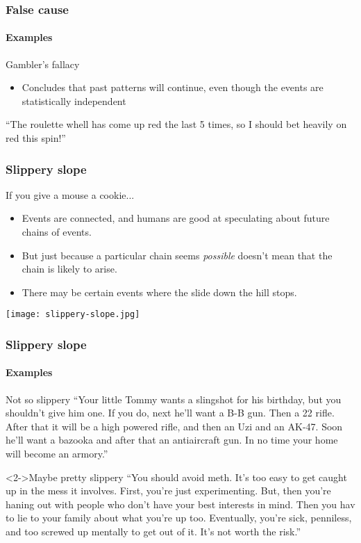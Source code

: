 \documentclass[10pt,letterpaper,xcolor=dvipsnames]{beamer}
\begin{document}
\begin{frame}
  \frametitle{False cause}
  \framesubtitle{Examples}
  
  \begin{block}{Gambler's fallacy}
    \begin{itemize}
      \item Concludes that past patterns will continue, even though the events are statistically independent
    \end{itemize}
    
    ``The roulette whell has come up red the last 5 times, so I should bet heavily on red this spin!''
  \end{block}
  
\end{frame}

\begin{frame}
  \frametitle{Slippery slope}
  
  \begin{block}{If you give a mouse a cookie...}
    \begin{itemize}
      \item Events are connected, and humans are good at speculating about future chains of events.
      \item But just because a particular chain seems \textit{possible} doesn't mean that the chain is likely to arise.
      \item There may be certain events where the slide down the hill stops.
    \end{itemize}
  \end{block}
  
    \begin{center}
    \texttt{[image: slippery-slope.jpg]}
  \end{center}
  
\end{frame}

\begin{frame}
  \frametitle{Slippery slope}
  \framesubtitle{Examples}
  
  \begin{block}{Not so slippery}
  ``Your little Tommy wants a slingshot for his birthday, but you shouldn’t give him one.  If you do, next he’ll want a B-B gun.  Then a 22 rifle.  After that it will be a high powered rifle, and then an Uzi and an AK-47.  Soon he’ll want a bazooka and after that an antiaircraft gun.  In no time your home will become an armory.''
  \end{block}
  
    \begin{block}<2->{Maybe pretty slippery}
    ``You should avoid meth.  It's too easy to get caught up in the mess it involves.  First, you're just experimenting.  But, then you're haning out with people who don't have your best interests in mind.  Then you hav to lie to your family about what you're up too.  Eventually, you're sick, penniless, and too screwed up mentally to get out of it.  It's not worth the risk.''
  \end{block}
  
\end{frame}
\end{document}
